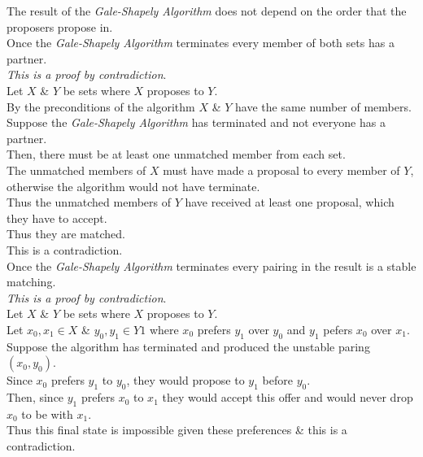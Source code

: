 \documentclass[11pt,a4paper]{article}
\begin{document}
The result of the \textit{Gale-Shapely Algorithm} does not depend on the order that the proposers propose in.\\

Once the \textit{Gale-Shapely Algorithm} terminates every member of both sets has a partner.\\

\textit{This is a proof by contradiction}.\\
Let $X$ \& $Y$ be sets where $X$ proposes to $Y$.\\
By the preconditions of the algorithm $X$ \& $Y$ have the same number of members.\\
Suppose the \textit{Gale-Shapely Algorithm} has terminated and not everyone has a partner.\\
Then, there must be at least one unmatched member from each set.\\
The unmatched members of $X$ must have made a proposal to every member of $Y$, otherwise the algorithm would not have terminate.\\
Thus the unmatched members of $Y$ have received at least one proposal, which they have to accept.\\
Thus they are matched.\\
This is a contradiction.\\

Once the \textit{Gale-Shapely Algorithm} terminates every pairing in the result is a stable matching.\\

\textit{This is a proof by contradiction}.\\
Let $X$ \& $Y$ be sets where $X$ proposes to $Y$.\\
Let $x_0, x_1\in X$ \& $y_0, y_1\in Y1$ where $x_0$ prefers $y_1$ over $y_0$ and $y_1$ pefers $x_0$ over $x_1$.\\
Suppose the algorithm has terminated and produced the unstable paring $(x_0, y_0)$.\\
Since $x_0$ prefers $y_1$ to $y_0$, they would propose to $y_1$ before $y_0$.\\
Then, since $y_1$ prefers $x_0$ to $x_1$ they would accept this offer and would never drop $x_0$ to be with $x_1$.\\
Thus this final state is impossible given these preferences \& this is a contradiction.\\
\end{document}
